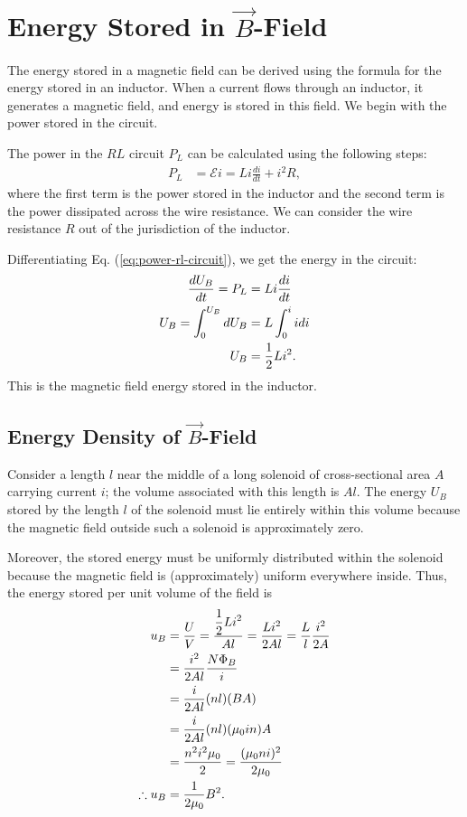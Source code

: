 \documentclass[12pt,b4paper]{article}
\begin{document}
\section{Energy Stored in $\vec{B}$-Field}
The energy stored in a magnetic field can be derived using the formula for the energy stored in an inductor. When a current flows through an inductor, it generates a magnetic field, and energy is stored in this field. We begin with the power stored in the circuit.

The power in the $RL$ circuit $P_L$ can be calculated using the following steps:
\begin{align}
    P_L&=\mathcal{E}i=Li\frac{di}{dt}+i^2R,\label{eq:power-rl-circuit}
\end{align}
where the first term is the power stored in the inductor and the second term is the power dissipated across the wire resistance. We can consider the wire resistance $R$ out of the jurisdiction of the inductor.

Differentiating Eq. (\ref{eq:power-rl-circuit}), we get the energy in the circuit:
\begin{align}
    \frac{dU_B}{dt}=P_L&=Li\frac{di}{dt}\notag\\
    U_B=\int_0^{U_B}dU_B&=L\int_0^iidi\notag\\
    U_B&=\frac{1}{2}Li^2.
\end{align}
This is the magnetic field energy stored in the inductor.
\subsection{Energy Density of $\vec{B}$-Field}
Consider a length $l$ near the middle of a long solenoid of cross-sectional area $A$ carrying current $i$; the volume associated with this length is $Al$. The energy $U_B$ stored by the length $l$ of the solenoid must lie entirely within this volume because the magnetic field outside such a solenoid is approximately zero.

Moreover, the stored energy must be uniformly distributed within the solenoid because the magnetic field is (approximately) uniform everywhere inside. Thus, the energy stored per unit volume of the field is
\begin{align}
    u_B&=\frac{U}{V}=\frac{\displaystyle \frac{1}{2}Li^2}{Al}=\frac{Li^2}{2Al}=\frac{L}{l}\frac{i^2}{2A}\notag\\
    &=\frac{i^2}{2Al}\frac{N\Phi_B}{i}\notag\\
    &=\frac{i}{2Al}(nl)(BA)\notag\\
    &=\frac{i}{2Al}(nl)(\mu_0in)A\notag\\
    &=\frac{n^2i^2\mu_0}{2}=\frac{(\mu_0ni)^2}{2\mu_0}\notag\\
    \therefore u_B&=\frac{1}{2\mu_0}B^2.
\end{align}
\end{document}

